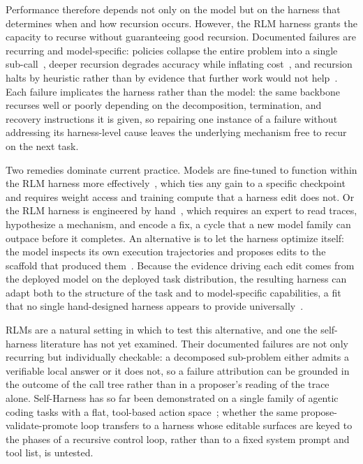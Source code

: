 \documentclass{article}
\newcommand{\rlms}{\textsc{RLM}s\xspace}
\begin{document}
Performance therefore depends not only on the model but on the harness that determines
when and how recursion occurs. However, the RLM harness grants the capacity to recurse without
guaranteeing good recursion. Documented failures are recurring and model-specific:
policies collapse the entire problem into a single sub-call~\citep{zhang2026harness},
deeper recursion degrades accuracy while inflating cost~\citep{wang2026overthink}, and
recursion halts by heuristic rather than by evidence that further work would not
help~\citep{guha2026termination}. Each failure implicates the harness rather than the
model: the same backbone recurses well or poorly depending on the decomposition,
termination, and recovery instructions it is given, so repairing one instance of a
failure without addressing its harness-level cause leaves the underlying mechanism free
to recur on the next task.

Two remedies dominate current practice. Models are fine-tuned to function within the RLM
harness more effectively~\citep{zhang2026harness,yang2026recursive}, which ties any gain
to a specific checkpoint and requires weight access and training compute that a harness
edit does not. Or the RLM harness is engineered by
hand~\citep{alizadeh2026srlm,roy2026ycombinator,lumer2026rah}, which requires an expert to
read traces, hypothesize a mechanism, and encode a fix, a cycle that a new model family can
outpace before it completes. An alternative is to let the harness optimize itself: the
model inspects its own execution trajectories and proposes edits to the scaffold that
produced them~\citep{weng2026harness,lee2026rhi,zhang2026selfharness}. Because the evidence
driving each edit comes from the deployed model on the deployed task distribution, the
resulting harness can adapt both to the structure of the task and to model-specific
capabilities, a fit that no single hand-designed harness appears to provide
universally~\citep{zhang2026selfharness,lee2026rhi,gupta2026nosuperior}.

\rlms are a natural setting in which to test this alternative, and one the self-harness
literature has not yet examined. Their documented failures are not only recurring but
individually checkable: a decomposed sub-problem either admits a verifiable local answer
or it does not, so a failure attribution can be grounded in the outcome of the call tree
rather than in a proposer's reading of the trace alone. Self-Harness has so far been
demonstrated on a single family of agentic coding tasks with a flat, tool-based action
space~\citep{zhang2026selfharness}; whether the same propose-validate-promote loop
transfers to a harness whose editable surfaces are keyed to the phases of a recursive
control loop, rather than to a fixed system prompt and tool list, is untested.
\end{document}
